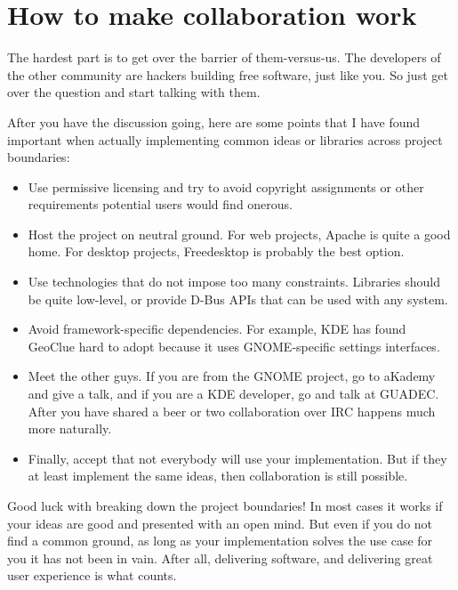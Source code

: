 \section*{How to make collaboration work}

The hardest part is to get over the barrier of them-versus-us. The developers of the other community are hackers building free software, just like you. So just get over the question and start talking with them.

After you have the discussion going, here are some points that I have found important when actually implementing common ideas or libraries across project boundaries:

\begin{itemize}
\item Use permissive licensing and try to avoid copyright assignments or other requirements potential users would find onerous.
\item Host the project on neutral ground. For web projects, Apache is quite a good home. For desktop projects, Freedesktop is probably the best option.
\item Use technologies that do not impose too many constraints. Libraries should be quite low-level, or provide D-Bus APIs that can be used with any system.
\item Avoid framework-specific dependencies. For example, KDE has found GeoClue hard to adopt because it uses GNOME-specific settings interfaces.
\item Meet the other guys. If you are from the GNOME project, go to aKademy and give a talk, and if you are a KDE developer, go and talk at GUADEC. After you have shared a beer or two collaboration over IRC happens much more naturally.
\item Finally, accept that not everybody will use your implementation. But if they at least implement the same ideas, then collaboration is still possible.
\end{itemize}

Good luck with breaking down the project boundaries! In most cases it works if your ideas are good and presented with an open mind.  But even if you do not find a common ground, as long as your implementation solves the use case for you it has not been in vain. After all, delivering software, and delivering great user experience is what counts.
